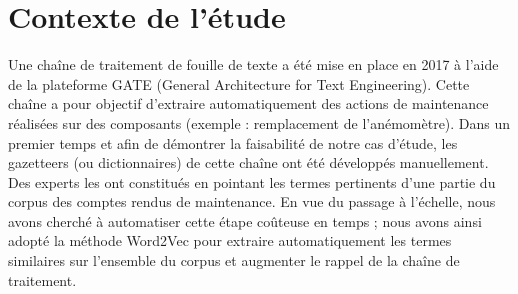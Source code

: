 \section{Contexte de l'étude}
Une chaîne de traitement de fouille de texte a été mise en place en 2017 à l’aide de la plateforme GATE (General Architecture for Text Engineering). Cette chaîne a pour objectif d’extraire automatiquement des actions de maintenance réalisées sur des composants (exemple : remplacement de l’anémomètre). Dans un premier temps et afin de démontrer la faisabilité de notre cas d’étude, les gazetteers (ou dictionnaires) de cette chaîne ont été développés manuellement. Des experts les ont constitués en pointant les termes pertinents d’une partie du corpus des comptes rendus de maintenance. En vue du passage à l’échelle, nous avons  cherché à automatiser cette étape coûteuse en temps ; nous avons ainsi adopté la méthode Word2Vec pour extraire automatiquement les termes similaires sur l’ensemble du corpus et augmenter le rappel de la chaîne de traitement.
